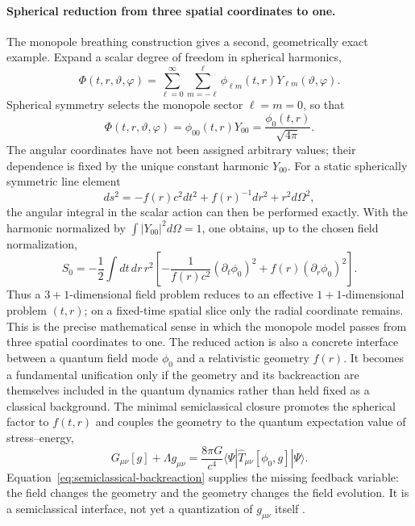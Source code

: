 \documentclass[11pt]{amsart}
\theoremstyle{definition}
\theoremstyle{remark}
\begin{document}
\paragraph{Spherical reduction from three spatial coordinates to one.}
The monopole breathing construction gives a second, geometrically exact example.  Expand a scalar
degree of freedom in spherical harmonics,
\begin{equation}\label{eq:spherical-expansion}
  \Phi(t,r,\vartheta,\varphi)
  =\sum_{\ell=0}^{\infty}\sum_{m=-\ell}^{\ell}
  \phi_{\ell m}(t,r)Y_{\ell m}(\vartheta,\varphi).
\end{equation}
Spherical symmetry selects the monopole sector $\ell=m=0$, so that
\begin{equation}\label{eq:monopole-reduction}
  \Phi(t,r,\vartheta,\varphi)
  =\phi_{00}(t,r)Y_{00}
  =\frac{\phi_0(t,r)}{\sqrt{4\pi}}.
\end{equation}
The angular coordinates have not been assigned arbitrary values; their dependence is fixed by the
unique constant harmonic $Y_{00}$.  For a static spherically symmetric line element
\begin{equation}
  ds^2=-f(r)c^2dt^2+f(r)^{-1}dr^2+r^2d\Omega^2,
\end{equation}
the angular integral in the scalar action can then be performed exactly.  With the harmonic
normalized by $\int|Y_{00}|^2d\Omega=1$, one obtains, up to the chosen field normalization,
\begin{equation}\label{eq:radial-action}
  S_0=-\frac12\int dt\,dr\,r^2
  \left[-\frac{1}{f(r)c^2}(\partial_t\phi_0)^2
  +f(r)(\partial_r\phi_0)^2\right].
\end{equation}
Thus a $3+1$-dimensional field problem reduces to an effective $1+1$-dimensional problem
$(t,r)$; on a fixed-time spatial slice only the radial coordinate remains.  This is the precise
mathematical sense in which the monopole model passes from three spatial coordinates to one.
The reduced action is also a concrete interface between a quantum field mode $\phi_0$ and a
relativistic geometry $f(r)$.  It becomes a fundamental unification only if the geometry and its
backreaction are themselves included in the quantum dynamics rather than held fixed as a
classical background.
The minimal semiclassical closure promotes the spherical factor to $f(t,r)$ and couples the
geometry to the quantum expectation value of stress--energy,
\begin{equation}\label{eq:semiclassical-backreaction}
  G_{\mu\nu}[g]+\Lambda g_{\mu\nu}
  =\frac{8\pi G}{c^4}
  \langle\Psi|\widehat T_{\mu\nu}[\phi_0,g]|\Psi\rangle .
\end{equation}
Equation~\eqref{eq:semiclassical-backreaction} supplies the missing feedback variable: the field
changes the geometry and the geometry changes the field evolution.  It is a semiclassical
interface, not yet a quantization of $g_{\mu\nu}$ itself \cite{BirrellDavies}.
\end{document}
